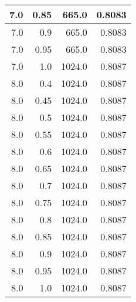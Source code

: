 \begin{center}
\begin{longtable}{|r|r|r|r|}
\hline
7.0 & 0.85 & 665.0 & 0.8083 \\
\hline
7.0 & 0.9 & 665.0 & 0.8083 \\
\hline
7.0 & 0.95 & 665.0 & 0.8083 \\
\hline
7.0 & 1.0 & 1024.0 & 0.8087 \\
\hline
8.0 & 0.4 & 1024.0 & 0.8087 \\
\hline
8.0 & 0.45 & 1024.0 & 0.8087 \\
\hline
8.0 & 0.5 & 1024.0 & 0.8087 \\
\hline
8.0 & 0.55 & 1024.0 & 0.8087 \\
\hline
8.0 & 0.6 & 1024.0 & 0.8087 \\
\hline
8.0 & 0.65 & 1024.0 & 0.8087 \\
\hline
8.0 & 0.7 & 1024.0 & 0.8087 \\
\hline
8.0 & 0.75 & 1024.0 & 0.8087 \\
\hline
8.0 & 0.8 & 1024.0 & 0.8087 \\
\hline
8.0 & 0.85 & 1024.0 & 0.8087 \\
\hline
8.0 & 0.9 & 1024.0 & 0.8087 \\
\hline
8.0 & 0.95 & 1024.0 & 0.8087 \\
\hline
8.0 & 1.0 & 1024.0 & 0.8087 \\
\hline

\end{longtable}
\end{center}
